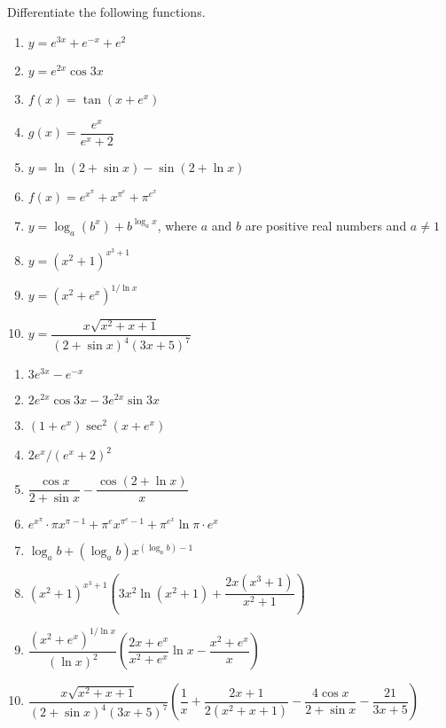 \begin{enumialphparenastyle}
\begin{ex}
Differentiate the following functions.
\begin{enumerate}
	\item	$y=e^{3x}+e^{-x}+e^2$
	\item	$y=e^{2x}\cos 3x$
	\item	$f(x)=\tan(x+e^x)$
	\item	$g(x)=\dfrac{e^x}{e^x+2}$
	\item	$y=\ln(2+\sin x)-\sin(2+\ln x)$
	\item	$f(x)=e^{x^{\pi}}+x^{\pi^{e}}+\pi^{e^x}$
	\item	$y=\log _{a}(b^x)+b^{\log_a x}$, where $a$ and $b$ are positive real numbers and $a\neq 1$
	\item	$y=(x^2+1)^{x^3+1}$
	\item	$y=(x^2+e^x)^{1/\ln x}$
	\item	$y=\dfrac{x\sqrt{x^2+x+1}}{(2+\sin x)^4(3x+5)^7}$
\end{enumerate}
\begin{sol}
\begin{enumerate}
	\item	$3e^{3x}-e^{-x}$
	\item	$2e^{2x}\cos 3x-3e^{2x}\sin 3x$
	\item	$(1+e^x)\sec^2(x+e^x)$
	\item	$2e^x/(e^x+2)^2$
	\item	$\dfrac{\cos x}{2+\sin x}-\dfrac{\cos(2+\ln	x)}{x}$
	\item	$e^{x^{\pi}}\cdot\pi x^{\pi-1}+\pi^e x^{\pi^e-1}+\pi^{e^x}\ln\pi\cdot e^x$
	\item	$\log_{a}b+(\log_{a}b) x^{(\log_{a}b)-1}$
	\item	$(x^2+1)^{x^3+1}\left(3x^2\ln(x^2+1)+\dfrac{2x(x^3+1)}{x^2+1}\right)$
	\item	$\dfrac{(x^2+e^x)^{1/\ln x}}{(\ln x)^2}\left(\dfrac{2x+e^x}{x^2+e^x}\ln	x-\dfrac{x^2+e^x}{x}\right)$
	\item	$\dfrac{x\sqrt{x^2+x+1}}{(2+\sin x)^4 (3x+5)^7} \left(\dfrac{1}{x}+\dfrac{2x+1}{2(x^2+x+1)}-\dfrac{4\cos x}{2+\sin x}-\dfrac{21}{3x+5}\right)$
\end{enumerate}
\end{sol}
\end{ex}


\end{enumialphparenastyle}
